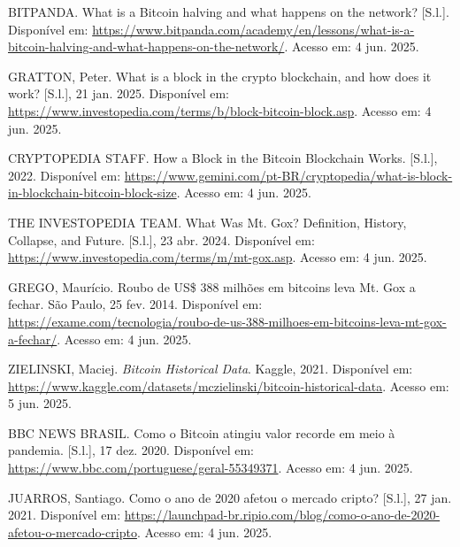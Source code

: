 \begin{thebibliography}{26}
     BITPANDA. What is a Bitcoin halving and what happens on the network? [S.l.]. Disponível em: 
    \href{https://www.bitpanda.com/academy/en/lessons/what-is-a-bitcoin-halving-and-what-happens-on-the-network/}{https://www.bitpanda.com/academy/en/lessons/what-is-a-bitcoin-halving-and-what-happens-on-the-network/}. 
    Acesso em: 4 jun. 2025.
    
     GRATTON, Peter. What is a block in the crypto blockchain, and how does it work? [S.l.], 21 jan. 2025. Disponível em: 
    \href{https://www.investopedia.com/terms/b/block-bitcoin-block.asp}{https://www.investopedia.com/terms/b/block-bitcoin-block.asp}. 
    Acesso em: 4 jun. 2025.
    
     CRYPTOPEDIA STAFF. How a Block in the Bitcoin Blockchain Works. [S.l.], 2022. Disponível em: 
    \href{https://www.gemini.com/pt-BR/cryptopedia/what-is-block-in-blockchain-bitcoin-block-size}{https://www.gemini.com/pt-BR/cryptopedia/what-is-block-in-blockchain-bitcoin-block-size}.  
    Acesso em: 4 jun. 2025.
    
     THE INVESTOPEDIA TEAM. What Was Mt. Gox? Definition, History, Collapse, and Future. [S.l.], 23 abr. 2024. Disponível em: 
    \href{https://www.investopedia.com/terms/m/mt-gox.asp}{https://www.investopedia.com/terms/m/mt-gox.asp}. 
    Acesso em: 4 jun. 2025.
    
     GREGO, Maurício. Roubo de US\$ 388 milhões em bitcoins leva Mt. Gox a fechar. São Paulo, 25 fev. 2014. Disponível em: 
    \href{https://exame.com/tecnologia/roubo-de-us-388-milhoes-em-bitcoins-leva-mt-gox-a-fechar/}{https://exame.com/tecnologia/roubo-de-us-388-milhoes-em-bitcoins-leva-mt-gox-a-fechar/}.
    Acesso em: 4 jun. 2025.
    
    ZIELINSKI, Maciej. \textit{Bitcoin Historical Data}. Kaggle, 2021. Disponível em: 
    \href{https://www.kaggle.com/datasets/mczielinski/bitcoin-historical-data}{https://www.kaggle.com/datasets/mczielinski/bitcoin-historical-data}. 
    Acesso em: 5 jun. 2025.
    
     BBC NEWS BRASIL. Como o Bitcoin atingiu valor recorde em meio à pandemia. [S.l.], 17 dez. 2020. Disponível em: 
    \href{https://www.bbc.com/portuguese/geral-55349371}{https://www.bbc.com/portuguese/geral-55349371}. 
    Acesso em: 4 jun. 2025.
    
     JUARROS, Santiago. Como o ano de 2020 afetou o mercado cripto? [S.l.], 27 jan. 2021. Disponível em: 
    \href{https://launchpad-br.ripio.com/blog/como-o-ano-de-2020-afetou-o-mercado-cripto}{https://launchpad-br.ripio.com/blog/como-o-ano-de-2020-afetou-o-mercado-cripto}. 
    Acesso em: 4 jun. 2025.
    

\end{thebibliography}
